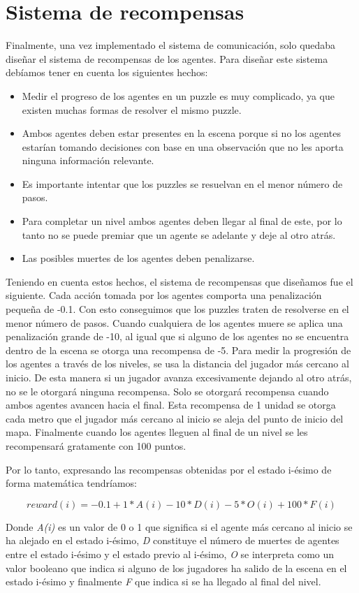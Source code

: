 \section{Sistema de recompensas}

Finalmente, una vez implementado el sistema de comunicación, solo quedaba diseñar el sistema de recompensas de los agentes. Para diseñar este sistema debíamos tener en cuenta los siguientes hechos:

\begin{itemize}
    \item Medir el progreso de los agentes en un puzzle es muy complicado, ya que existen muchas formas de resolver el mismo puzzle.
    \item Ambos agentes deben estar presentes en la escena porque si no los agentes estarían tomando decisiones con base en una observación que no les aporta ninguna información relevante.
    \item Es importante intentar que los puzzles se resuelvan en el menor número de pasos.
    \item Para completar un nivel ambos agentes deben llegar al final de este, por lo tanto no se puede premiar que un agente se adelante y deje al otro atrás.
    \item Las posibles muertes de los agentes deben penalizarse.
\end{itemize}

Teniendo en cuenta estos hechos, el sistema de recompensas que diseñamos fue el siguiente. Cada acción tomada por los agentes comporta una penalización pequeña de -0.1. Con esto conseguimos que los puzzles traten de resolverse en el menor número de pasos. Cuando cualquiera de los agentes muere se aplica una penalización grande de -10, al igual que si alguno de los agentes no se encuentra dentro de la escena se otorga una recompensa de -5. Para medir la progresión de los agentes a través de los niveles, se usa la distancia del jugador más cercano al inicio. De esta manera si un jugador avanza excesivamente dejando al otro atrás, no se le otorgará ninguna recompensa. Solo se otorgará recompensa cuando ambos agentes avancen hacia el final.  Esta recompensa de 1 unidad se otorga cada metro que el jugador más cercano al inicio se aleja del punto de inicio del mapa. Finalmente cuando los agentes lleguen al final de un nivel se les recompensará gratamente con 100 puntos.

Por lo tanto, expresando las recompensas obtenidas por el estado i-ésimo de forma matemática tendríamos:

\[ reward (i) =  - 0.1 + 1 * A(i) - 10 * D(i) - 5 * O(i) + 100 * F(i) \] 

Donde \textit{A(i)} es un valor de 0 o 1 que significa si el agente más cercano al inicio se ha alejado en el estado i-ésimo, \textit{D} constituye el número de muertes de agentes entre el estado i-ésimo y el estado previo al i-ésimo, \textit{O} se interpreta como un valor booleano que indica si alguno de los jugadores ha salido de la escena en el estado i-ésimo y finalmente \textit{F} que indica si se ha llegado al final del nivel.

